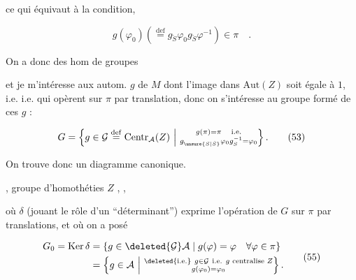 ce qui équivaut à la condition,  

\[
g(\varphi_0)\left(\overset{\mathrm{def}}{=}g_{\check S}\varphi_0g_{\check S}\varphi^{-1}\right)\in\pi\quad.
\tag*{(51)}
\]

On a donc des hom de groupes


et je m'intéresse aux autom. $g$ de $M$ dont l'image dans $\mathrm{Aut}(Z)$ soit égale à $1$, i.e.  i.e. qui opèrent sur $\pi$ par translation,  donc on s'intéresse au groupe formé de ces $g$ :

\[
G=\left\{g\in\mathcal G\overset{\mathrm{def}}{=}\mathrm{Centr}_{\mathcal A}(Z)\ \middle|\ \substack{g(\pi)=\pi\quad\mathrm{i.e.}\\g_{\unsure{S|\check S}}\varphi_0g_S^{-1}=\varphi_0}\right\}.
\tag*{(53)}
\]

On trouve donc un diagramme canonique.


,  groupe d'homothéties $Z$ , , 


où $\delta$ (jouant le rôle d'un \textquotedblleft{}déterminant\textquotedblright) exprime l'opération de $G$ sur $\pi$ par translations, et où on a posé

\[
\begin{aligned}
G_0=\mathrm{Ker}\,\delta&=\{g\in\deleted{\mathcal G}\mathcal A\mid g(\varphi)=\varphi\quad\forall\varphi\in\pi\}\\
&=\left\{g\in\mathcal A\ \middle|\ \substack{\deleted{\text{i.e.}}\ g\in\mathcal G\ \text{i.e. }g\text{ centralise }Z\\g(\varphi_0)=\varphi_0}\right\}.
\end{aligned}
\tag*{(55)}
\]

